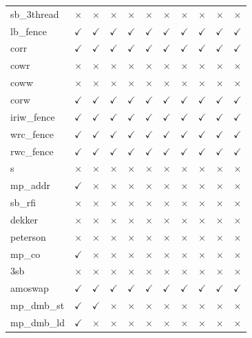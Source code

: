 \documentclass[10pt]{article}
\newcommand{\cmark}{$\checkmark$}
\newcommand{\xmark}{$\times$}
\begin{document}
{\begin{table}[p]
\begin{tabular}{l cccc cccccc}
sb\_3thread & \xmark & \xmark & \xmark & \xmark & \xmark & \xmark & \xmark & \xmark & \xmark & \xmark \\
lb\_fence & \cmark & \cmark & \cmark & \cmark & \cmark & \cmark & \cmark & \cmark & \cmark & \cmark \\
corr & \cmark & \cmark & \cmark & \cmark & \cmark & \cmark & \cmark & \cmark & \cmark & \cmark \\
cowr & \xmark & \xmark & \xmark & \xmark & \xmark & \xmark & \xmark & \xmark & \xmark & \xmark \\
coww & \xmark & \xmark & \xmark & \xmark & \xmark & \xmark & \xmark & \xmark & \xmark & \xmark \\
corw & \cmark & \cmark & \cmark & \cmark & \cmark & \cmark & \cmark & \cmark & \cmark & \cmark \\
iriw\_fence & \cmark & \cmark & \cmark & \cmark & \cmark & \cmark & \cmark & \cmark & \cmark & \cmark \\
wrc\_fence & \cmark & \cmark & \cmark & \cmark & \cmark & \cmark & \cmark & \cmark & \cmark & \cmark \\
rwc\_fence & \cmark & \cmark & \cmark & \cmark & \cmark & \cmark & \cmark & \cmark & \cmark & \cmark \\
s & \xmark & \xmark & \xmark & \xmark & \xmark & \xmark & \xmark & \xmark & \xmark & \xmark \\
mp\_addr & \cmark & \xmark & \xmark & \xmark & \xmark & \xmark & \xmark & \xmark & \xmark & \xmark \\
sb\_rfi & \xmark & \xmark & \xmark & \xmark & \xmark & \xmark & \xmark & \xmark & \xmark & \xmark \\
dekker & \xmark & \xmark & \xmark & \xmark & \xmark & \xmark & \xmark & \xmark & \xmark & \xmark \\
peterson & \xmark & \xmark & \xmark & \xmark & \xmark & \xmark & \xmark & \xmark & \xmark & \xmark \\
mp\_co & \cmark & \xmark & \xmark & \xmark & \xmark & \xmark & \xmark & \xmark & \xmark & \xmark \\
3sb & \xmark & \xmark & \xmark & \xmark & \xmark & \xmark & \xmark & \xmark & \xmark & \xmark \\
amoswap & \cmark & \cmark & \cmark & \cmark & \cmark & \cmark & \cmark & \cmark & \cmark & \cmark \\
mp\_dmb\_st & \cmark & \cmark & \xmark & \xmark & \xmark & \xmark & \xmark & \xmark & \xmark & \xmark \\
mp\_dmb\_ld & \cmark & \xmark & \xmark & \xmark & \xmark & \xmark & \xmark & \xmark & \xmark & \xmark \\

\end{tabular}
\end{table}}
\end{document}

